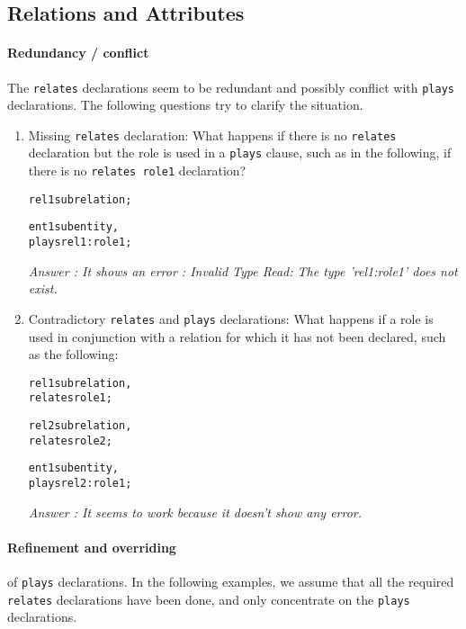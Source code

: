 \documentclass[runningheads]{llncs}
\begin{document}
\subsection{Relations and Attributes}\label{sec:questions_rels_attribs}

\paragraph{Redundancy / conflict} The \texttt{relates} declarations seem to be
redundant and possibly conflict with \texttt{plays} declarations. The
following questions try to clarify the situation.

\begin{enumerate}
\item Missing \texttt{relates} declaration: What happens if there is no
  \texttt{relates} declaration but the role is used in a \texttt{plays}
  clause, such as in the following, if there is no \texttt{relates role1}
  declaration? 

  \begin{alltt}
rel1 sub relation;

ent1 sub entity,
  plays rel1:role1;
  \end{alltt}

\emph{Answer : It shows an error : Invalid Type Read: The type 'rel1:role1' does not exist. }


\item Contradictory \texttt{relates} and \texttt{plays} declarations: What
  happens if a role is used in conjunction with a relation for which it has
  not been declared, such as the following:

  \begin{alltt}
rel1 sub relation,
  relates role1;

rel2 sub relation,
  relates role2;

ent1 sub entity,
  plays rel2:role1;
  \end{alltt}

\emph{Answer : It seems to work because it doesn't show any error. }


\end{enumerate}

\paragraph{Refinement and overriding} of \texttt{plays} declarations. In the
following examples, we assume that all the required \texttt{relates}
declarations have been done, and only concentrate on the \texttt{plays}
declarations.
\end{document}
